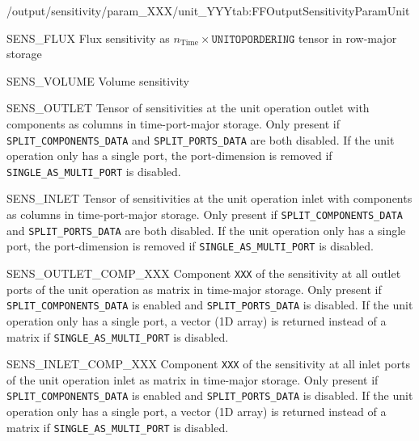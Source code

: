 \begin{groupscope}{/output/sensitivity/param\_XXX/unit\_YYY}{tab:FFOutputSensitivityParamUnit}
\begin{dataset}[type=double,unit={\si{\mol\per\square\metre\per\second\per\ParamUnit}}]{SENS\_FLUX}
    Flux sensitivity as $n_{\text{Time}} \times \texttt{UNITOPORDERING}$ tensor in row-major storage
  \end{dataset}
  \begin{dataset}[type=double,unit={\si{\cubic\metre\per\ParamUnit}}]{SENS\_VOLUME}
    Volume sensitivity
  \end{dataset}
  \begin{dataset}[type=double,unit={\si{\mol\per\cubic\metre\of{IV}\per\ParamUnit}}]{SENS\_OUTLET}
    Tensor of sensitivities at the unit operation outlet with components as columns in time-port-major storage.
    Only present if \texttt{SPLIT\_COMPONENTS\_DATA} and \texttt{SPLIT\_PORTS\_DATA} are both disabled.
    If the unit operation only has a single port, the port-dimension is removed if \texttt{SINGLE\_AS\_MULTI\_PORT} is disabled.
  \end{dataset}
  \begin{dataset}[type=double,unit={\si{\mol\per\cubic\metre\of{IV}\per\ParamUnit}}]{SENS\_INLET}
    Tensor of sensitivities at the unit operation inlet with components as columns in time-port-major storage.
    Only present if \texttt{SPLIT\_COMPONENTS\_DATA} and \texttt{SPLIT\_PORTS\_DATA} are both disabled.
    If the unit operation only has a single port, the port-dimension is removed if \texttt{SINGLE\_AS\_MULTI\_PORT} is disabled.
  \end{dataset}
  \begin{dataset}[type=double,unit={\si{\mol\per\cubic\metre\of{IV}\per\ParamUnit}}]{SENS\_OUTLET\_COMP\_XXX}
    Component \texttt{XXX} of the sensitivity at all outlet ports of the unit operation as matrix in time-major storage.
    Only present if \texttt{SPLIT\_COMPONENTS\_DATA} is enabled and \texttt{SPLIT\_PORTS\_DATA} is disabled.
    If the unit operation only has a single port, a vector (1D array) is returned instead of a matrix if \texttt{SINGLE\_AS\_MULTI\_PORT} is disabled.
  \end{dataset}
  \begin{dataset}[type=double,unit={\si{\mol\per\cubic\metre\of{IV}\per\ParamUnit}}]{SENS\_INLET\_COMP\_XXX}
    Component \texttt{XXX} of the sensitivity at all inlet ports of the unit operation inlet as matrix in time-major storage.
    Only present if \texttt{SPLIT\_COMPONENTS\_DATA} is enabled and \texttt{SPLIT\_PORTS\_DATA} is disabled.
    If the unit operation only has a single port, a vector (1D array) is returned instead of a matrix if \texttt{SINGLE\_AS\_MULTI\_PORT} is disabled.
  \end{dataset}

\end{groupscope}
